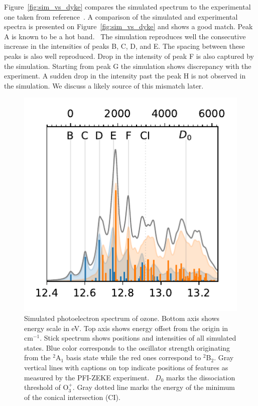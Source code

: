 \documentclass[12pt,pra,aps,superscriptaddress]{revtex4-2}
\begin{document}
Figure~\ref{fig:sim_vs_dyke} compares the simulated spectrum to the
experimental one taken from reference~\cite{dyke:O3:74}. A comparison of the
simulated and experimental spectra is presented on
Figure~\ref{fig:sim_vs_dyke} and shows a good match. Peak A is known to be a
hot band.~\cite{KDC:O3:92} The simulation reproduces well the consecutive
increase in the intensities of peaks B, C, D, and E. The spacing between these
peaks is also well reproduced. Drop in the intensity of peak F is also
captured by the simulation. Starting from peak G the simulation shows
discrepancy with the experiment. A sudden drop in the intensity past the peak
H is not observed in the simulation. We discuss a likely source of this
mismatch later.

\begin{figure}
    \includegraphics[width=10 cm]{figures/spectrum_overline}
    \caption{
        Simulated photoelectron spectrum of ozone. Bottom axis shows energy
        scale in eV. Top axis shows energy offset from the origin in
        cm$^{-1}$. Stick spectrum shows positions and intensities of all
        simulated states. Blue color corresponds to the oscillator strength
        originating from the $^2$A$_1$ basis state while the red ones
        correspond to $^2$B$_2$. Gray vertical lines with captions on top
        indicate positions of features as measured by the PFI-ZEKE
        experiment.~\cite{Willitsch:O3ZEKE:2005} 
        $D_0$ marks the dissociation threshold of O$_3^+$.
        Gray dotted line marks the energy of the minimum of the conical
        intersection (CI).
    }
    \label{fig:ozone_overlay}
\end{figure}
\end{document}
